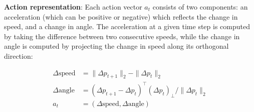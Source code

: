 \documentclass{article} %
\begin{document}



\textbf{Action representation}: Each action vector $a_t$ consists of two components: an acceleration (which can be positive or negative) which reflects the change in speed, and a change in angle.
The acceleration at a given time step is computed by taking the difference between two consecutive speeds, while the change in angle is computed by projecting the change in speed along its orthogonal direction:

\begin{align*}
  \Delta \mbox{speed} &= \| \Delta p_{t+1} \|_2 - \| \Delta p_t \|_2 \\
  \Delta \mbox{angle} &= (\Delta p_{t+1} - \Delta p_t)^\top (\Delta p_t)_\perp / \| \Delta p_t \|_2  \\
  a_t &= (\Delta \mbox{speed}, \Delta \mbox{angle}) \\
\end{align*}
\end{document}
